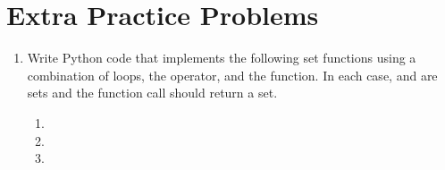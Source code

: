 \documentclass[letterpaper,10pt,english]{sphinxmanual}
\begin{document}
\section{Extra Practice Problems}
\label{\detokenize{lecture_notes/lec15_sets:extra-practice-problems}}\begin{enumerate}
\item {} 
Write Python code that implements the following set functions using a
combination of loops, the  operator, and the  function.
In each case,  and  are sets and the function call should
return a set.
\begin{enumerate}
\item {} 

\item {} 

\item {} 

\end{enumerate}

\end{enumerate}
\end{document}
